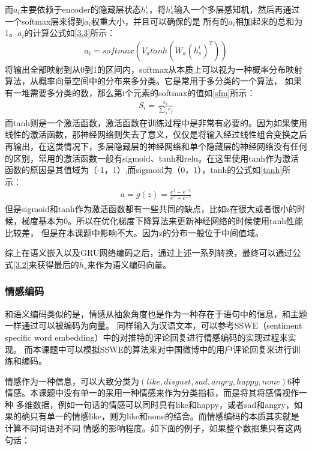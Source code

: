 \documentclass[supercite]{HustGraduPaper}
\theoremstyle{definition}
\begin{document}
而$a_i$主要依赖于encoder的隐藏层状态$h_s^i$，将$h_s^i$输入一个多层感知机，然后再通过一个softmax层来得到$a_i$权重大小，并且可以确保的是
所有的$a_i$相加起来的总和为1。$a_i$的计算公式如\ref{3.3}所示：
\begin{align}
  a_i = softmax(V_a tanh(W_a(h_s^i)^T)) \label{3.3}
\end{align}
将输出全部映射到从0到1的区间内，softmax从本质上可以视为一种概率分布映射算法，从概率向量空间中的分布来多分类。它是常用于多分类的一个算法，
如果有一堆需要多分类的数，那么第i个元素的softmax的值如\ref{sfm}所示：
\begin{align}
  S_i = \frac{e_i}{\sum_j e_j} \label{sfm}
\end{align}
而tanh则是一个激活函数，激活函数在训练过程中是非常有必要的。因为如果使用线性的激活函数，那神经网络则失去了意义，仅仅是将输入经过线性组合变换之后
再输出，在这类情况下，多层隐藏层的神经网络和单个隐藏层的神经网络没有任何的区别，常用的激活函数一般有sigmoid、tanh和relu。在这里使用tanh作为激活
函数的原因是其值域为（-1，1）,而sigmoid为（0，1），tanh的公式如\ref{tanh}所示：
\begin{align}
  a = g(z) = \frac{e^z - e^{-z}}{e^z + e^{-z}} \label{tanh}
\end{align}
但是sigmoid和tanh作为激活函数都有一些共同的缺点，比如z在很大或者很小的时候，梯度基本为0。所以在优化梯度下降算法来更新神经网络的时候使用tanh性能比较差，
但是在本课题中影响不大。因为z的分布一般位于中间值域。

综上在语义嵌入以及GRU网络编码之后，通过上述一系列转换，最终可以通过公式\ref{3.2}来获得最后的$\widetilde{h_s}$来作为语义编码向量。

\subsubsection{情感编码}
和语义编码类似的是，情感从抽象角度也是作为一种存在于语句中的信息，和主题一样通过可以被编码为向量。
同样输入为汉语文本，可以参考SSWE\cite{tang-etal-2014-learning}（sentiment specific word embedding）中的对推特的评论回复进行情感编码的实现过程来实现。
而本课题中可以模拟SSWE\cite{tang-etal-2014-learning}的算法来对中国微博中的用户评论回复来进行训练和编码。

情感作为一种信息，可以大致分类为$(like, disgust, sad, angry, happy, none)$6种情感。本课题中没有单一的采用一种情感来作为分类指标，而是将其将感情视作一种
多维数据，例如一句话的情感可以同时具有like和happy，或者sad和angry，如果的确只有单一的情感like，则为like和none的结合。而情感编码的本质其实就是计算不同词语对不同
情感的影响程度。如下面的例子，如果整个数据集只有这两句话：
\end{document}
